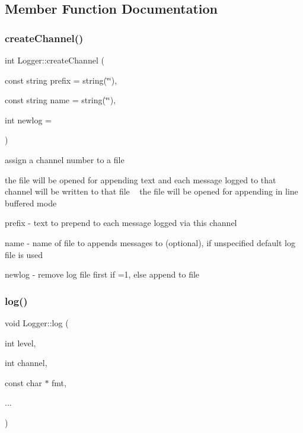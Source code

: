 \subsection{Member Function Documentation}
\mbox{\label{classLogger_a61e5d07bd9b1fd3296e737063d9e1809}} 
\subsubsection{\texorpdfstring{create\+Channel()}{createChannel()}}
{\footnotesize\ttfamily int Logger\+::create\+Channel (\begin{DoxyParamCaption}\item[{const string}]{prefix = {\ttfamily string(\char`\"{}\char`\"{})},  }\item[{const string}]{name = {\ttfamily string(\char`\"{}\char`\"{})},  }\item[{int}]{newlog = {} }\end{DoxyParamCaption})}



assign a channel number to a file 

the file will be opened for appending text and each message logged to that channel will be written to that file ~\newline
the file will be opened for appending in line buffered mode

\begin{DoxyItemize}
\item {\ttfamily prefix} -\/ text to prepend to each message logged via this channel \item {\ttfamily name} -\/ name of file to appends messages to (optional), if unspecified default log file is used \item {\ttfamily newlog} -\/ remove log file first if =1, else append to file \end{DoxyItemize}
\mbox{\label{classLogger_a3277d0171f23be48ef40d86a01786284}} 
\subsubsection{\texorpdfstring{log()}{log()}}
{\footnotesize\ttfamily void Logger\+::log (\begin{DoxyParamCaption}\item[{int}]{level,  }\item[{int}]{channel,  }\item[{const char $\ast$}]{fmt,  }\item[{}]{... }\end{DoxyParamCaption})}



